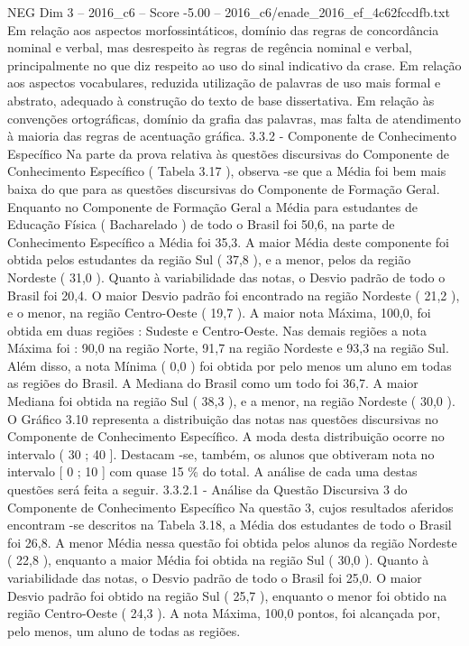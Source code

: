 \begin{textsample}{NEG Dim 3 – 2016\_c6 – Score -5.00 – 2016\_c6/enade\_2016\_ef\_4c62fccdfb.txt}
Em relação aos aspectos morfossintáticos, domínio das regras de concordância nominal e verbal, mas desrespeito às regras de regência nominal e verbal, principalmente no que diz respeito ao uso do sinal indicativo da crase.
Em relação aos aspectos vocabulares, reduzida utilização de palavras de uso mais formal e abstrato, adequado à construção do texto de base dissertativa.
Em relação às convenções ortográficas, domínio da grafia das palavras, mas falta de atendimento à maioria das regras de acentuação gráfica. 3.3.2 - Componente de Conhecimento Específico Na parte da prova relativa às questões discursivas do Componente de Conhecimento Específico ( Tabela 3.17 ), observa -se que a Média foi bem mais baixa do que para as questões discursivas do Componente de Formação Geral.
Enquanto no Componente de Formação Geral a Média para estudantes de Educação Física ( Bacharelado ) de todo o Brasil foi 50,6, na parte de Conhecimento Específico a Média foi 35,3.
A maior Média deste componente foi obtida pelos estudantes da região Sul ( 37,8 ), e a menor, pelos da região Nordeste ( 31,0 ).
Quanto à variabilidade das notas, o Desvio padrão de todo o Brasil foi 20,4.
O maior Desvio padrão foi encontrado na região Nordeste ( 21,2 ), e o menor, na região Centro-Oeste ( 19,7 ).
A maior nota Máxima, 100,0, foi obtida em duas regiões : Sudeste e Centro-Oeste.
Nas demais regiões a nota Máxima foi : 90,0 na região Norte, 91,7 na região Nordeste e 93,3 na região Sul.
Além disso, a nota Mínima ( 0,0 ) foi obtida por pelo menos um aluno em todas as regiões do Brasil.
A Mediana do Brasil como um todo foi 36,7.
A maior Mediana foi obtida na região Sul ( 38,3 ), e a menor, na região Nordeste ( 30,0 ).
O Gráfico 3.10 representa a distribuição das notas nas questões discursivas no Componente de Conhecimento Específico.
A moda desta distribuição ocorre no intervalo ( 30 ; 40 ].
Destacam -se, também, os alunos que obtiveram nota no intervalo [ 0 ; 10 ] com quase 15 \% do total.
A análise de cada uma destas questões será feita a seguir. 3.3.2.1 - Análise da Questão Discursiva 3 do Componente de Conhecimento Específico Na questão 3, cujos resultados aferidos encontram -se descritos na Tabela 3.18, a Média dos estudantes de todo o Brasil foi 26,8.
A menor Média nessa questão foi obtida pelos alunos da região Nordeste ( 22,8 ), enquanto a maior Média foi obtida na região Sul ( 30,0 ).
Quanto à variabilidade das notas, o Desvio padrão de todo o Brasil foi 25,0.
O maior Desvio padrão foi obtido na região Sul ( 25,7 ), enquanto o menor foi obtido na região Centro-Oeste ( 24,3 ).
A nota Máxima, 100,0 pontos, foi alcançada por, pelo menos, um aluno de todas as regiões.

\end{textsample}
